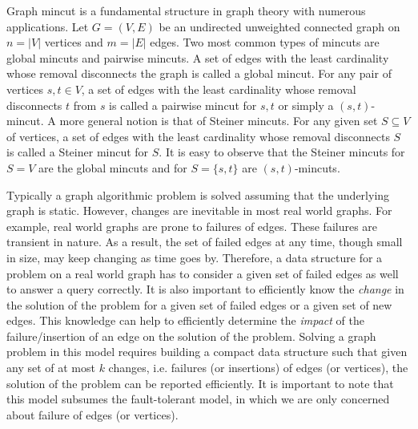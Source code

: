 Graph mincut is a fundamental structure in graph theory with numerous applications. Let $G=(V,E)$ be an undirected unweighted connected graph on $n=|V|$ vertices and $m=|E|$ edges.
Two most common types of mincuts are global mincuts and pairwise mincuts. A set of edges with the least cardinality whose removal disconnects the graph is called a global mincut. For any pair of vertices $s,t\in V$, 
a set of edges with the least cardinality whose removal disconnects $t$ from $s$ is called a pairwise mincut for $s,t$ or simply a $(s,t)$-mincut. A more general notion is that of Steiner mincuts. For any given set $S\subseteq V$ of vertices, a set of edges with the least cardinality whose removal disconnects $S$ is called a Steiner mincut for $S$. It is easy to observe that the Steiner mincuts for $S=V$ are the global mincuts and for $S=\{s,t\}$ are $(s,t)$-mincuts.


 Typically a graph algorithmic problem is solved assuming that the underlying graph is static. However, changes are inevitable in most real world graphs. For example, real world graphs are prone to failures of edges. These failures are transient in nature. As a result, the set of failed edges at any time, though small in size, may keep changing as time goes by. Therefore, a data structure for a problem on a real world graph has to consider a given set of failed edges as well to answer a query correctly. It is also important to efficiently know the {\em change} in the solution of the problem for a given set of failed edges or a given set of new edges. This knowledge can help to efficiently determine the {\em impact} of the failure/insertion of an edge on the solution of the problem. Solving a graph problem in this model requires building a compact data structure such that given any set of at most $k$ changes, i.e. failures (or insertions) of edges (or vertices), the solution of the problem can be reported efficiently. It is important to note that this model subsumes the fault-tolerant model, in which we are only concerned about failure of edges (or vertices).


